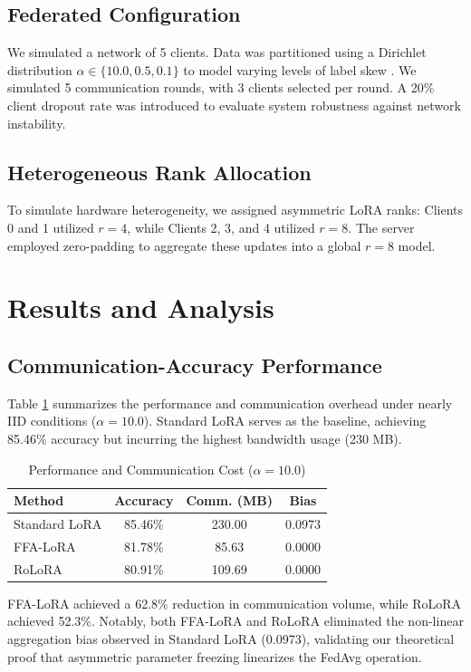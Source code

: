\subsection{Federated Configuration}
We simulated a network of 5 clients. Data was partitioned using a Dirichlet distribution $\alpha \in \{10.0, 0.5, 0.1\}$ to model varying levels of label skew \cite{zhao2018federated}. We simulated 5 communication rounds, with 3 clients selected per round. A 20\% client dropout rate was introduced to evaluate system robustness against network instability.

\subsection{Heterogeneous Rank Allocation}
To simulate hardware heterogeneity, we assigned asymmetric LoRA ranks: Clients 0 and 1 utilized $r=4$, while Clients 2, 3, and 4 utilized $r=8$. The server employed zero-padding to aggregate these updates into a global $r=8$ model.

\section{Results and Analysis}
\subsection{Communication-Accuracy Performance}
Table \ref{tab:results} summarizes the performance and communication overhead under nearly IID conditions ($\alpha=10.0$). Standard LoRA serves as the baseline, achieving 85.46\% accuracy but incurring the highest bandwidth usage (230 MB).

\begin{table}[h]
\centering
\caption{Performance and Communication Cost ($\alpha=10.0$)}
\label{tab:results}
\begin{tabular}{lccc}
\toprule
Method & Accuracy & Comm. (MB) & Bias \\
\midrule
Standard LoRA & 85.46\% & 230.00 & 0.0973 \\
FFA-LoRA      & 81.78\% & 85.63  & 0.0000 \\
RoLoRA        & 80.91\% & 109.69 & 0.0000 \\
\bottomrule
\end{tabular}
\end{table}

FFA-LoRA achieved a 62.8\% reduction in communication volume, while RoLoRA achieved 52.3\%. Notably, both FFA-LoRA and RoLoRA eliminated the non-linear aggregation bias observed in Standard LoRA (0.0973), validating our theoretical proof that asymmetric parameter freezing linearizes the FedAvg operation.

